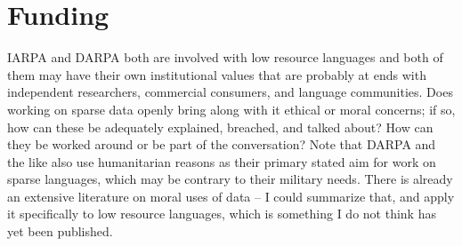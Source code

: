 \documentclass[10pt, a4paper]{article}
\begin{document}
%
%


\section{Funding}

IARPA and DARPA both are involved with low resource languages and both of them may have their own institutional values that are probably at ends with independent researchers, commercial consumers, and language communities. Does working on sparse data openly bring along with it ethical or moral concerns; if so, how can these be adequately explained, breached, and talked about? How can they be worked around or be part of the conversation? Note that DARPA and the like also use humanitarian reasons as their primary stated aim for work on sparse languages, which may be contrary to their military needs. There is already an extensive literature on moral uses of data -- I could summarize that, and apply it specifically to low resource languages, which is something I do not think has yet been published.
\end{document}
